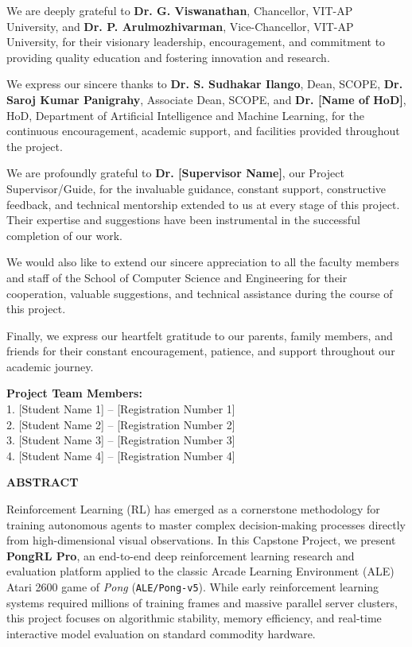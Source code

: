 \documentclass[12pt,a4paper]{report}
\begin{document}
We are deeply grateful to \textbf{Dr. G. Viswanathan}, Chancellor, VIT-AP University, and \textbf{Dr. P. Arulmozhivarman}, Vice-Chancellor, VIT-AP University, for their visionary leadership, encouragement, and commitment to providing quality education and fostering innovation and research.

We express our sincere thanks to \textbf{Dr. S. Sudhakar Ilango}, Dean, SCOPE, \textbf{Dr. Saroj Kumar Panigrahy}, Associate Dean, SCOPE, and \textbf{Dr. [Name of HoD]}, HoD, Department of Artificial Intelligence and Machine Learning, for the continuous encouragement, academic support, and facilities provided throughout the project.

We are profoundly grateful to \textbf{Dr. [Supervisor Name]}, our Project Supervisor/Guide, for the invaluable guidance, constant support, constructive feedback, and technical mentorship extended to us at every stage of this project. Their expertise and suggestions have been instrumental in the successful completion of our work.

We would also like to extend our sincere appreciation to all the faculty members and staff of the School of Computer Science and Engineering for their cooperation, valuable suggestions, and technical assistance during the course of this project.

Finally, we express our heartfelt gratitude to our parents, family members, and friends for their constant encouragement, patience, and support throughout our academic journey.

\vspace{1.0cm}
\noindent
\textbf{Project Team Members:} \\
1. [Student Name 1] -- [Registration Number 1] \\
2. [Student Name 2] -- [Registration Number 2] \\
3. [Student Name 3] -- [Registration Number 3] \\
4. [Student Name 4] -- [Registration Number 4]

\newpage
\thispagestyle{plain}
\begin{center}
    \large \textbf{ABSTRACT}
\end{center}
\vspace{0.5cm}
Reinforcement Learning (RL) has emerged as a cornerstone methodology for training autonomous agents to master complex decision-making processes directly from high-dimensional visual observations. In this Capstone Project, we present \textbf{PongRL Pro}, an end-to-end deep reinforcement learning research and evaluation platform applied to the classic Arcade Learning Environment (ALE) Atari 2600 game of \textit{Pong} (\texttt{ALE/Pong-v5}). While early reinforcement learning systems required millions of training frames and massive parallel server clusters, this project focuses on algorithmic stability, memory efficiency, and real-time interactive model evaluation on standard commodity hardware.
\end{document}
